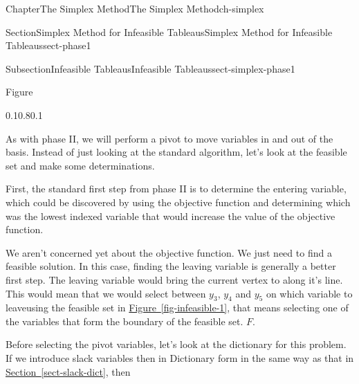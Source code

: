 \documentclass[oneside,10pt,]{book}
\newcommand{\xreffont}{\relax}
\numberwithin{equation}{section}
\begin{document}
\begin{chapterptx}{Chapter}{The Simplex Method}{}{The Simplex Method}{}{}{ch-simplex}
\begin{sectionptx}{Section}{Simplex Method for Infeasible Tableaus}{}{Simplex Method for Infeasible Tableaus}{}{}{sect-phase1}
\begin{subsectionptx}{Subsection}{Infeasible Tableaus}{}{Infeasible Tableaus}{}{}{sect-simplex-phase1}
\begin{figureptx}{Figure}
\begin{image}{0.1}{0.8}{0.1}{}
{    %
}%
\end{image}%
\tcblower
\end{figureptx}%
As with phase II, we will perform a pivot to move variables in and out of the basis. Instead of just looking at the standard algorithm, let's look at the feasible set and make some determinations.%
\par
First, the standard first step from phase II is to determine the entering variable, which could be discovered by using the objective function and determining which was the lowest indexed variable that would increase the value of the objective function.%
\par
We aren't concerned yet about the objective function. We just need to find a feasible solution. In this case, finding the leaving variable is generally a better first step. The leaving variable would bring the current vertex to along it's line. This would mean that we would select between \(y_3\), \(y_4\) and \(y_5\) on which variable to leave\textemdash{}using the feasible set in \hyperref[fig-infeasible-1]{Figure~{\xreffont\ref{fig-infeasible-1}}}, that means selecting one of the variables that form the boundary of the feasible set. \(F\).%
\par
Before selecting the pivot variables, let's look at the dictionary for this problem. If we introduce slack variables then in Dictionary form in the same way as that in \hyperref[sect-slack-dict]{Section~{\xreffont\ref{sect-slack-dict}}}, then%

\end{subsectionptx}
\end{sectionptx}
\end{chapterptx}
\end{document}
